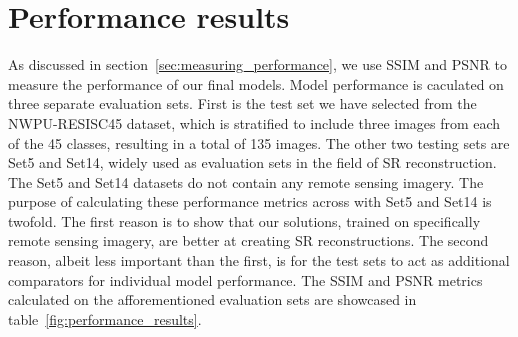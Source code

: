 \section{Performance results}
As discussed in section~\ref{sec:measuring_performance}, we use SSIM and PSNR to measure the performance of our final models. Model performance is caculated on three separate evaluation sets. First is the test set we have selected from the NWPU-RESISC45 dataset, which is stratified to include three images from each of the 45 classes, resulting in a total of 135 images. The other two testing sets are Set5 and Set14, widely used as evaluation sets in the field of SR reconstruction. The Set5 and Set14 datasets do not contain any remote sensing imagery. The purpose of calculating these performance metrics across with Set5 and Set14 is twofold. The first reason is to show that our solutions, trained on specifically remote sensing imagery, are better at creating SR reconstructions. The second reason, albeit less important than the first, is for the test sets to act as additional comparators for individual model performance. The SSIM and PSNR metrics calculated on the afforementioned evaluation sets are showcased in table~\ref{fig:performance_results}.
